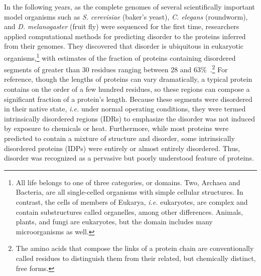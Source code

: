 In the following years, as the complete genomes of several scientifically important model organisms such as \textit{S. cerevisiae} (baker's yeast), \textit{C. elegans} (roundworm), and \textit{D. melanogaster} (fruit fly) were sequenced for the first time, researchers applied computational methods for predicting disorder to the proteins inferred from their genomes. They discovered that disorder is ubiquitous in eukaryotic organisms,\footnote{All life belongs to one of three categories, or domains. Two, Archaea and Bacteria, are all single-celled organisms with simple cellular structures. In contrast, the cells of members of Eukarya, \textit{i.e.} eukaryotes, are complex and contain substructures called organelles, among other differences. Animals, plants, and fungi are eukaryotes, but the domain includes many microorganisms as well.} with estimates of the fraction of proteins containing disordered segments of greater than 30 residues ranging between 28 and 63\%~\cite{Dunker2000, Ward2004}.\footnote{The amino acids that compose the links of a protein chain are conventionally called residues to distinguish them from their related, but chemically distinct, free forms.} For reference, though the lengths of proteins can vary dramatically, a typical protein contains on the order of a few hundred residues, so these regions can compose a significant fraction of a protein's length. Because these segments were disordered in their native state, \textit{i.e.} under normal operating conditions, they were termed intrinsically disordered regions (IDRs) to emphasize the disorder was not induced by exposure to chemicals or heat. Furthermore, while most proteins were predicted to contain a mixture of structure and disorder, some intrinsically disordered proteins (IDPs) were entirely or almost entirely disordered. Thus, disorder was recognized as a pervasive but poorly understood feature of proteins.

